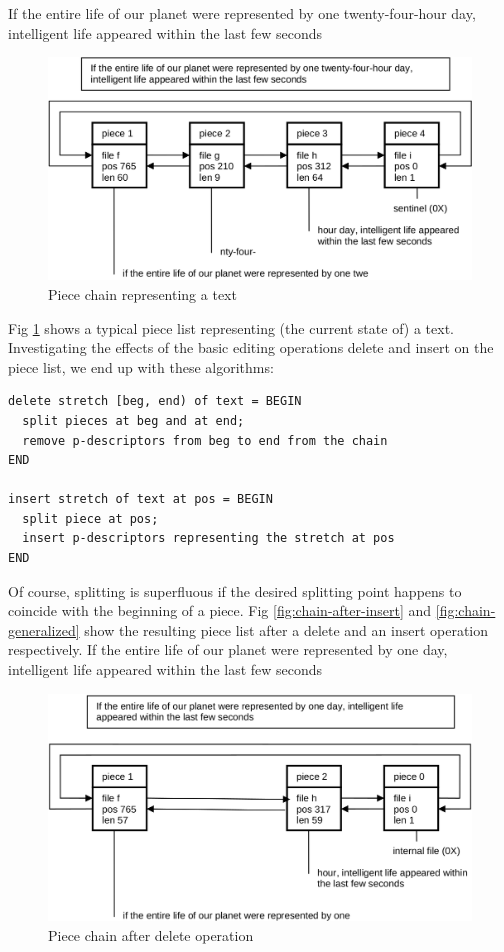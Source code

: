 If the entire life of our planet were represented by one twenty-four-hour day,
intelligent life appeared within the last few seconds
\begin{figure}
  \label{fig:chain}
  \centering
  \includegraphics[width=\textwidth]{i/d}
  \caption{Piece chain representing a text}
\end{figure}

Fig \ref{fig:chain} shows a typical piece list representing (the current state of) a text. Investigating the
effects of the basic editing operations delete and insert on the piece list, we end up with these
algorithms:
\begin{verbatim}
delete stretch [beg, end) of text = BEGIN
  split pieces at beg and at end;
  remove p-descriptors from beg to end from the chain
END

insert stretch of text at pos = BEGIN
  split piece at pos;
  insert p-descriptors representing the stretch at pos
END
\end{verbatim}
Of course, splitting is superfluous if the desired splitting point happens to coincide with the
beginning of a piece. Fig \ref{fig:chain-after-insert} and \ref{fig:chain-generalized} show the resulting piece list after a delete and an insert operation respectively.
If the entire life of our planet were represented by one day, intelligent life
appeared within the last few seconds
\begin{figure}
  \label{fig:chain-after-delete}
  \centering
  \includegraphics[width=\textwidth]{i/e}
  \caption{Piece chain after delete operation}
\end{figure}

